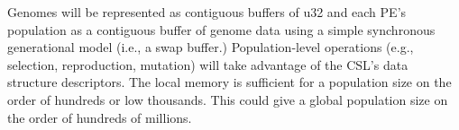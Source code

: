 Genomes will be represented as contiguous buffers of u32 and each PE's population as a contiguous buffer of genome data using a simple synchronous generational model (i.e., a swap buffer.)
Population-level operations (e.g., selection, reproduction, mutation) will take advantage of the CSL's data structure descriptors.
The local memory is sufficient for a population size on the order of hundreds or low thousands.
This could give a global population size on the order of hundreds of millions.
